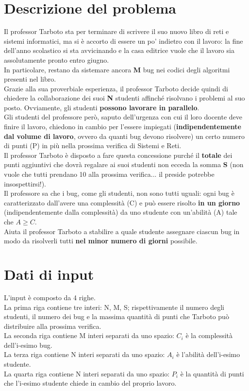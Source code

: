 \documentclass[a4paper,11pt]{article}
\begin{document}
\vspace{0.5cm}



\section*{Descrizione del problema}
Il professor Tarboto sta per terminare di scrivere il suo nuovo libro di reti e sistemi informatici, ma si è accorto di essere un po' indietro con il lavoro: la fine dell'anno scolastico si sta avvicinando e la casa editrice vuole che il lavoro sia assolutamente pronto entro giugno. \\
In particolare, restano da sistemare ancora \textbf{M} bug nei codici degli algoritmi presenti nel libro. \\
Grazie alla sua proverbiale esperienza, il professor Tarboto decide quindi di chiedere la collaborazione dei suoi \textbf{N} studenti affinché risolvano i problemi al suo posto. Ovviamente, gli studenti \textbf{possono lavorare in parallelo}. \\
Gli studenti del professore però, saputo dell'urgenza con cui il loro docente deve finire il lavoro, chiedono in cambio per l'essere impiegati (\textbf{indipendentemente dal volume di lavoro}, ovvero da quanti bug devono risolvere) un certo numero di punti (P) in più nella prossima verifica di Sistemi e Reti. \\
Il professor Tarboto è disposto a fare questa concessione purché il \textbf{totale} dei punti aggiuntivi che dovrà regalare ai suoi studenti non ecceda la somma \textbf{S} (non vuole che tutti prendano 10 alla prossima verifica... il preside potrebbe insospettirsi!). \\
Il professore sa che i bug, come gli studenti, non sono tutti uguali: ogni bug è caratterizzato dall'avere una complessità (C) e può essere risolto \textbf{in un giorno} (indipendentemente dalla complessità) da uno studente con un'abilità (A) tale che \textbf{$A \geq C$}.\\
Aiuta il professor Tarboto a stabilire a quale studente assegnare ciascun bug in modo da risolverli tutti \textbf{nel minor numero di giorni} possibile.

\section*{Dati di input}
  
L'input è composto da 4 righe. \\
La prima riga contiene tre interi: N, M, S; rispettivamente il numero degli studenti, il numero dei bug e la massima quantità di punti che Tarboto può distribuire alla prossima verifica.\\ 
La seconda riga contiene M interi separati da uno spazio: $C_i$ è la complessità dell'i-esimo bug.\\
La terza riga contiene N interi separati da uno spazio: $A_i$ è l'abilità dell'i-esimo studente. \\
La quarta riga contiene N interi separati da uno spazio: $P_i$ è la quantità di punti che l'i-esimo studente chiede in cambio del proprio lavoro.
\end{document}
